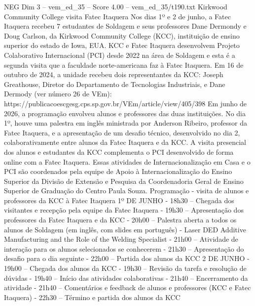 \begin{textsample}{NEG Dim 3 – vem\_ed\_35 – Score 4.00 – vem\_ed\_35/t190.txt}  \label{ex:f3_neg_135}
Kirkwood Community College visita Fatec Itaquera Nos dias 1º e 2 de junho, a Fatec Itaquera recebeu 7 estudantes de Soldagem e seus professores Dane Dermondy e Doug Carlson, da Kirkwood Community College (KCC), instituição de ensino superior do estado de Iowa, EUA.
KCC e Fatec Itaquera desenvolvem Projeto Colaborativo Internacional (PCI) desde 2022 na área de Soldagem e esta é a segunda visita que a faculdade norte-americana faz à Fatec Itaquera.
Em 16 de outubro de 2024, a unidade recebeu dois representantes da KCC: Joseph Greathouse, Diretor do Departamento de Tecnologias Industriais, e Dane Dermody (ver número 26 de VEm): https://publicacoescgesg.cps.sp.gov.br/VEm/article/view/405/398 Em junho de 2026, a programação envolveu alunos e professores das duas instituições.
No dia 1º, houve uma palestra em inglês ministrada por Anderson Ribeiro, professor da Fatec Itaquera, e a apresentação de um desafio técnico, desenvolvido no dia 2, colaborativamente entre alunos da Fatec Itaquera e da KCC.
A visita presencial dos alunos e estudantes da KCC complementa o PCI desenvolvido de forma online com a Fatec Itaquera.
Essas atividades de Internacionalização em Casa e o PCI são coordenados pela equipe de Apoio à Internacionalização do Ensino Superior da Divisão de Extensão e Pesquisa da Coordenadoria Geral de Ensino Superior de Graduação do Centro Paula Souza.
Programação - visita de alunos e professores da KCC à Fatec Itaquera 1º DE JUNHO - 18h30 – Chegada dos visitantes e recepção pela equipe da Fatec Itaquera - 19h30 – Apresentação dos professores da Fatec Itaquera e da KCC - 20h00 – Palestra aberta a todos os alunos de Soldagem (em inglês, com slides em português) - Laser DED Additive Manufacturing and the Role of the Welding Specialist - 21h00 – Atividade de interação para os alunos selecionados se conhecerem - 21h30 – Apresentação do desafio para o dia seguinte - 22h00 – Partida dos alunos da KCC 2 DE JUNHO - 19h00 – Chegada dos alunos da KCC - 19h30 – Revisão da tarefa e resolução de dúvidas - 19h40 – Início das atividades colaborativas - 21h40 – Encerramento da atividade - 21h40 – Comentários e feedback de alunos e professores (KCC e Fatec Itaquera) - 22h30 – Término e partida dos alunos da KCC

\end{textsample}
